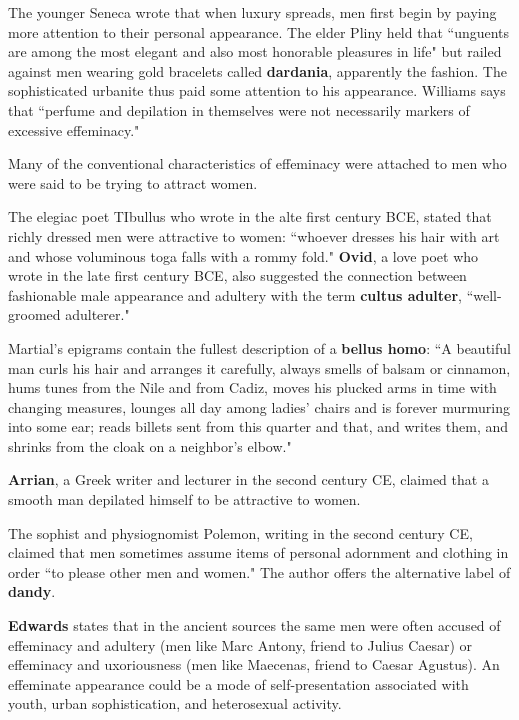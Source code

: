 The younger Seneca wrote that when luxury spreads, men first begin by paying more attention to their personal appearance. The elder Pliny held that ``unguents are among the most elegant and also most honorable pleasures in life" but railed against men wearing gold bracelets called \textbf{dardania}, apparently the fashion. The sophisticated urbanite thus paid some attention to his appearance. Williams says that ``perfume and depilation in themselves were not necessarily markers of excessive effeminacy."

\begin{nte}
    Many of the conventional characteristics of effeminacy were attached to men who were said to be trying to attract women.
\end{nte}

The elegiac poet TIbullus who wrote in the alte first century BCE, stated that richly dressed men were attractive to women: ``whoever dresses his hair with art and whose voluminous toga falls with a rommy fold." \textbf{Ovid}, a love poet who wrote in the late first century BCE, also suggested the connection between fashionable male appearance and adultery with the term \textbf{cultus adulter}, ``well-groomed adulterer."

\begin{defn}
    Martial's epigrams contain the fullest description of a \textbf{bellus homo}: ``A beautiful man curls his hair and arranges it carefully, always smells of balsam or cinnamon, hums tunes from the Nile and from Cadiz, moves his plucked arms in time with changing measures, lounges all day among ladies' chairs and is forever murmuring into some ear; reads billets sent from this quarter and that, and writes them, and shrinks from the cloak on a neighbor's elbow."
\end{defn}

\textbf{Arrian}, a Greek writer and lecturer in the second century CE, claimed that a smooth man depilated himself to be attractive to women.

The sophist and physiognomist Polemon, writing in the second century CE, claimed that men sometimes assume items of personal adornment and clothing in order ``to please other men and women." The author offers the alternative label of \textbf{dandy}.

\textbf{Edwards} states that in the ancient sources the same men were often accused of effeminacy and adultery (men like Marc Antony, friend to Julius Caesar) or effeminacy and uxoriousness (men like Maecenas, friend to Caesar Agustus). An effeminate appearance could be a mode of self-presentation associated with youth, urban  sophistication, and heterosexual activity. 

